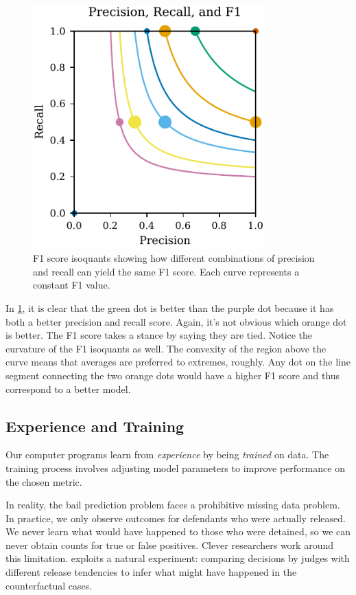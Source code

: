 \begin{figure}[H]
\centering
\includegraphics[width=0.8\textwidth]{images/scatter_precision_recall_f1.pdf}
\caption{F1 score isoquants showing how different combinations of precision and recall can yield the same F1 score. Each curve represents a constant F1 value.}
\label{fig:f1-isoquants}
\end{figure}

In \cref{fig:f1-isoquants}, it is clear that the green dot is better than the purple dot because it has both a better precision and recall score. Again, it's not obvious which orange dot is better. The F1 score takes a stance by saying they are tied. Notice the curvature of the F1 isoquants as well. The convexity of the region above the curve means that averages are preferred to extremes, roughly. Any dot on the line segment connecting the two orange dots would have a higher F1 score and thus correspond to a better model.

\subsection{Experience and Training}

Our computer programs learn from \textit{experience} by being \textit{trained} on data. The training process involves adjusting model parameters to improve performance on the chosen metric.

In reality, the bail prediction problem faces a prohibitive missing data problem. In practice, we only observe outcomes for defendants who were actually released. We never learn what would have happened to those who were detained, so we can never obtain counts for true or false positives. Clever researchers work around this limitation. \cite{kleinberg2018human} exploits a natural experiment: comparing decisions by judges with different release tendencies to infer what might have happened in the counterfactual cases.

